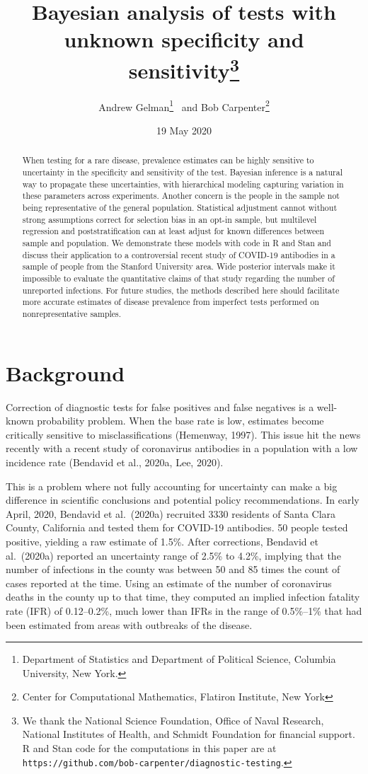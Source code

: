 \documentclass[11pt]{article}
\title{\bf Bayesian analysis of tests with unknown specificity and sensitivity\footnote{We thank the National Science Foundation, Office of Naval Research, National Institutes of Health, and Schmidt Foundation for financial support.  R and Stan code for the computations in this paper are at {\tt https://github.com/bob-carpenter/diagnostic-testing}.}\vspace{.1in}}
\author{Andrew Gelman\footnote{Department of Statistics and Department of
Political Science, Columbia University, New York.}  \ and Bob Carpenter\footnote{Center for Computational Mathematics, Flatiron Institute, New York}
\vspace{.1in}}
\date{19 May 2020}
\begin{document}
\sloppy
\maketitle

\begin{abstract}
When testing for a rare disease, prevalence estimates can be highly sensitive to uncertainty in the specificity and sensitivity of the test.  Bayesian inference is a natural way to propagate these uncertainties, with hierarchical modeling capturing variation in these parameters across experiments.  Another concern is the people in the sample not being representative of the general population.  Statistical adjustment cannot without strong assumptions correct for selection bias in an opt-in sample, but multilevel regression and poststratification can at least adjust for known differences between sample and population.  We demonstrate these models with code in R and Stan and discuss their application to a controversial recent study of COVID-19 antibodies in a sample of people from the Stanford University area.  Wide posterior intervals make it impossible to evaluate the quantitative claims of that study regarding the number of unreported infections.  For future studies, the methods described here should facilitate more accurate estimates of disease prevalence from imperfect tests performed on nonrepresentative samples.
\end{abstract}

\section{Background}

Correction of diagnostic tests for false positives and false negatives is a well-known probability problem.  When the base rate is low, estimates become critically sensitive to misclassifications (Hemenway, 1997).  This issue hit the news recently with a recent study of coronavirus antibodies in a population with a low incidence rate (Bendavid et al., 2020a, Lee, 2020).

This is a problem where not fully accounting for uncertainty can make a big difference in scientific conclusions and potential policy recommendations.  In early April, 2020, Bendavid et al.\ (2020a) recruited 3330 residents of Santa Clara County, California and tested them for COVID-19 antibodies.  50 people tested positive, yielding a raw estimate of 1.5\%.  After corrections, Bendavid et al.\ (2020a) reported an uncertainty range of 2.5\% to 4.2\%, implying that the number of infections in the county was between 50 and 85 times the count of cases reported at the time.  Using an estimate of the number of coronavirus deaths in the county up to that time, they computed an implied infection fatality rate (IFR) of 0.12--0.2\%, much lower than IFRs in the range of 0.5\%--1\% that had been estimated from areas with outbreaks of the disease.
\end{document}
